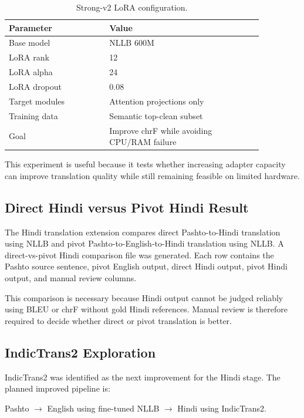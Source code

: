 \documentclass[conference]{IEEEtran}
\begin{document}
\begin{table}[H]
\centering
\caption{Strong-v2 LoRA configuration.}
\footnotesize
\begin{tabular}{p{0.34\linewidth}p{0.52\linewidth}}
\toprule
\textbf{Parameter} & \textbf{Value} \\
\midrule
Base model & NLLB 600M \\
LoRA rank & 12 \\
LoRA alpha & 24 \\
LoRA dropout & 0.08 \\
Target modules & Attention projections only \\
Training data & Semantic top-clean subset \\
Goal & Improve chrF while avoiding CPU/RAM failure \\
\bottomrule
\end{tabular}
\end{table}

This experiment is useful because it tests whether increasing adapter capacity can improve translation quality while still remaining feasible on limited hardware.

\subsection{Direct Hindi versus Pivot Hindi Result}

The Hindi translation extension compares direct Pashto-to-Hindi translation using NLLB and pivot Pashto-to-English-to-Hindi translation using NLLB. A direct-vs-pivot Hindi comparison file was generated. Each row contains the Pashto source sentence, pivot English output, direct Hindi output, pivot Hindi output, and manual review columns.

This comparison is necessary because Hindi output cannot be judged reliably using BLEU or chrF without gold Hindi references. Manual review is therefore required to decide whether direct or pivot translation is better.

\subsection{IndicTrans2 Exploration}

IndicTrans2 was identified as the next improvement for the Hindi stage. The planned improved pipeline is:

\begin{center}
Pashto $\rightarrow$ English using fine-tuned NLLB $\rightarrow$ Hindi using IndicTrans2.
\end{center}
\end{document}
